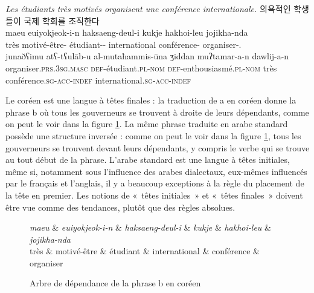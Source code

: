 {\ea \label{ex:motives}
    \ea \textit{{Les étudiants très motivés organisent une conférence internationale.}} 
    \ex {}  {\cjkfont 의욕적인}  {\cjkfont 학생들이}  {\cjkfont 국제}  {\cjkfont 학회를}   {\cjkfont 조직한다}\\
         maeu  {euiyokjeok-i-n}  {haksaeng-deul-i}  {kukje}  {hakhoi-leu}   {jojikha-nda}\\
         très   {motivé-être-\Q}   {étudiant-\PL-\NOM}  international  {conférence-\ACC}  organiser-\IND.\PRS\\
    \ex \gll junaðʕimu  atʕ-tʕul\=ab-u al-mutaħammis-\=una ʒiddan muʔtamar-a-n  dawlij-a-n\\
    organiser.\textsc{prs.3sg.masc} \textsc{def}-étudiant.\textsc{pl-nom} \textsc{def}-enthousiasmé.\textsc{pl-nom}  très conférence.\textsc{sg-acc-indef}  international.\textsc{sg-acc-indef}\\
  \z
\z
    
    Le coréen est une langue à têtes finales : la traduction de a en coréen donne la phrase b où tous les gouverneurs se trouvent à droite de leurs dépendants, comme on peut le voir dans la figure \ref{fig:motives-coreen}. La même phrase traduite en arabe standard possède une structure inversée : comme on peut le voir dans la figure \ref{fig:motives-coreen}, tous les gouverneurs se trouvent devant leurs dépendants, y compris le verbe qui se trouve au tout début de la phrase. L’arabe standard est une langue à têtes initiales, même si, notamment sous l'influence des arabes dialectaux, eux-mêmes influencés par le français et l'anglais, il y a beaucoup exceptions à la règle du placement de la tête en premier. Les notions de «~têtes initiales~» et «~têtes finales~» doivent être vue comme des tendances, plutôt que des règles absolues.

   
\begin{figure}[H]
    \caption{Arbre de dépendance de la phrase b en coréen\label{fig:motives-coreen}}
    \begin{dependency}[font=\footnotesize,arc edge, arc angle=80, text only label, label style={above}]
    \begin{deptext}
    \textit{maeu}  \& \textit{euiyokjeok-i-n} \& \textit{haksaeng-deul-i} \& \textit{kukje} \& \textit{hakhoi-leu} \& \textit{jojikha-nda}\\
    très  \& {motivé-être}  \& étudiant   \& international \& conférence \& organiser\\
    \end{deptext}
    \end{dependency}
\end{figure}

}
